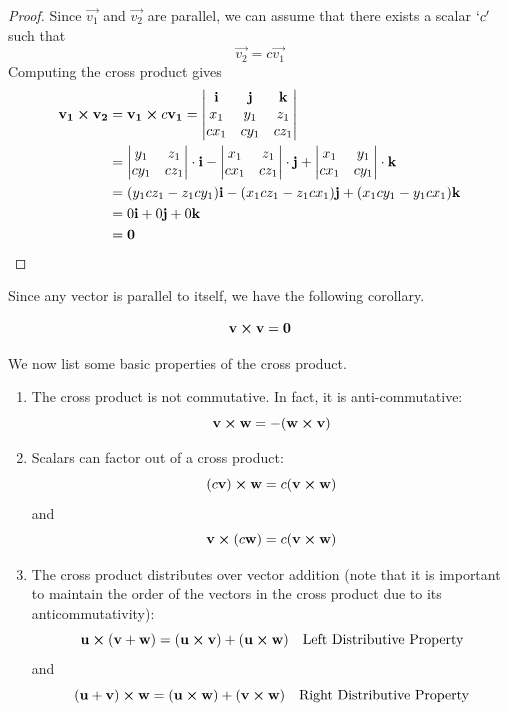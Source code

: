 \documentclass[handout]{ximera}
\begin{document}
\begin{proof}
Since $\vec{v_1}$ and $\vec{v_2}$ are parallel, we can assume that there exists a scalar $`c'$ such that 
\[
\vec{v_2} = c\vec{v_1}
\]
Computing the cross product gives
\begin{align*}
\mathbf{v_1} \boldsymbol\times \mathbf{v_2} &= \mathbf{v_1} \boldsymbol\times c\mathbf{v_1}
                         =  \begin{vmatrix}
                                  \mathbf{i} & \mathbf{j} & \mathbf{k}\\
                                      x_1 & y_1 & z_1\\
                                       cx_1 & cy_1 & cz_1
                            \end{vmatrix} \\
&= \begin{vmatrix}
 y_1 & z_1  \\
 cy_1 & cz_1 \\
 \end{vmatrix} \cdot \mathbf i
 - \begin{vmatrix}
 x_1 & z_1  \\
 cx_1 & cz_1 \\
 \end{vmatrix} \cdot \mathbf j
 + \begin{vmatrix}
 x_1 & y_1  \\
 cx_1 & cy_1 \\
 \end{vmatrix} \cdot \mathbf k\\
 &= (y_1cz_1 - z_1cy_1) \mathbf{i} - (x_1cz_1-z_1cx_1) \mathbf{j} + (x_1cy_1 - y_1cx_1) \mathbf{k}\\
 &=0 \mathbf{i} + 0 \mathbf{j} + 0 \mathbf{k}\\
 &= \mathbf 0
 \end{align*}
 \end{proof}
Since any vector is parallel to itself, we have the following corollary.


\begin{corollary}
\[
\mathbf v \boldsymbol\times \mathbf v = \mathbf 0
\]
\end{corollary}

We now list some basic properties of the cross product.\\

\begin{enumerate}
\item The cross product is not commutative.  In fact, it is anti-commutative:
\[
\mathbf{v} \boldsymbol\times \mathbf{w} = -(\mathbf{w} \boldsymbol\times \mathbf{v})
\]
\item Scalars can factor out of a cross product:
\[
(c\mathbf{v}) \boldsymbol\times \mathbf{w} = c(\mathbf{v} \boldsymbol\times \mathbf{w})
\]
and
\[
\mathbf{v} \boldsymbol\times (c\mathbf{w}) = c(\mathbf{v} \boldsymbol\times \mathbf{w})
\]
\item The cross product distributes over vector addition 
(note that it is important to maintain the order of the vectors in the cross product due to its anticommutativity):
\[
\mathbf{u} \boldsymbol\times (\mathbf{v} + \mathbf{w}) = (\mathbf{u} \boldsymbol\times \mathbf{v}) + (\mathbf{u} \boldsymbol\times \mathbf{w})\quad \text{Left Distributive Property}
\]
and
\[
(\mathbf{u} + \mathbf{v}) \boldsymbol\times \mathbf{w} = (\mathbf{u} \boldsymbol\times \mathbf{w}) + (\mathbf{v} \boldsymbol\times \mathbf{w})\quad \text{Right Distributive Property}
\]
\end{enumerate}
\end{document}
